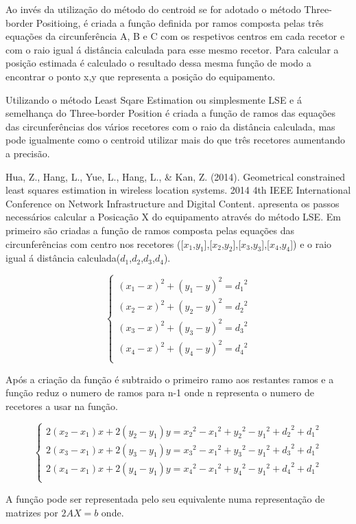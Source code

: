 Ao invés da utilização do método do centroid se for adotado o método Three-border Positioing, é criada a função definida por ramos composta pelas três equações da circunferência A, B e C com os respetivos centros em cada recetor e com o raio igual á distância calculada para esse mesmo recetor. Para calcular a posição estimada é calculado o resultado dessa mesma função de modo a encontrar o ponto x,y que representa a posição do equipamento.
\par 
Utilizando o método Least Sqare Estimation ou simplesmente LSE e á semelhança do Three-border Position\cite{Zhu2014} é criada a função de ramos das equações das circunferências dos vários recetores com o raio da distância calculada, mas pode igualmente como o centroid utilizar mais do que três recetores aumentando a precisão. \par Hua, Z., Hang, L., Yue, L., Hang, L., \& Kan, Z. (2014). Geometrical constrained least squares estimation in wireless location systems. 2014 4th IEEE International Conference on Network Infrastructure and Digital Content. apresenta os passos necessários calcular a Posicação X do equipamento através do método LSE. Em primeiro são criadas a função de ramos composta pelas equações das circunferências com centro nos recetores ([$x_{1}$,$y_{1}$],[$x_{2}$,$y_{2}$],[$x_{3}$,$y_{3}$],[$x_{4}$,$y_{4}$]) e o raio igual á distância calculada($d_{1}$,$d_{2}$,$d_{3}$,$d_{4}$).
\begin{center}
\[
  \begin{cases}
      (x_{1} -x)^2 + (y_{1}-y)^2 = {d_{1}}^2\\
      (x_{2} -x)^2 + (y_{2}-y)^2 = {d_{2}}^2\\
      (x_{3} -x)^2 + (y_{3}-y)^2 = {d_{3}}^2\\
      (x_{4} -x)^2 + (y_{4}-y)^2 = {d_{4}}^2\\
  \end{cases}
\]
\end{center}

\par Após a criação da função é subtraido o primeiro ramo aos restantes ramos e a função reduz o numero de ramos para n-1 onde n representa o numero de recetores a usar na função.
\begin{center}

\[
  \begin{cases}
     2(x_{2}-x_{1})x+2(y_{2}-y_{1})y={x_{2}}^2-{x_{1}}^2+{y_{2}}^2-{y_{1}}^2+{d_{2}}^2+{ d_{1}}^2\\
     2(x_{3}-x_{1})x+2(y_{3}-y_{1})y={x_{3}}^2-{x_{1}}^2+{y_{3}}^2-{y_{1}}^2+{d_{3}}^2+{ d_{1}}^2\\
     2(x_{4}-x_{1})x+2(y_{4}-y_{1})y={x_{4}}^2-{x_{1}}^2+{y_{4}}^2-{y_{1}}^2+{d_{4}}^2+{ d_{1}}^2\\
  \end{cases}
\]
\end{center}
\par A função pode ser representada pelo seu equivalente numa representação de matrizes por $2AX = b$ onde.

